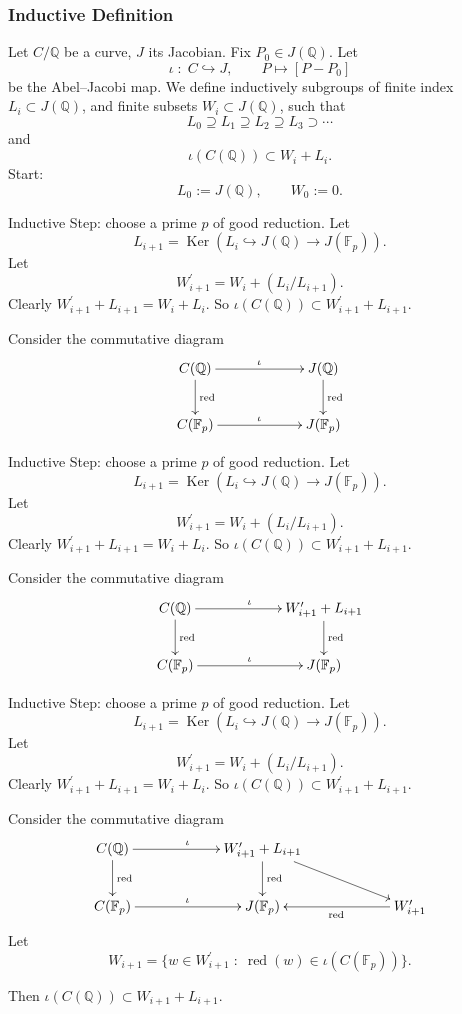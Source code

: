 \documentclass{beamer}
\DeclareMathOperator{\Ker}{Ker}
\DeclareMathOperator{\red}{red}
\newcommand{\Q}{{\mathbb Q}}
\newcommand{\F}{{\mathbb F}}
\theoremstyle{definition}
\theoremstyle{remark}
\begin{document}
\begin{frame}
\frametitle{Inductive Definition}
Let $C/\Q$ be a curve, $J$ its Jacobian. Fix $P_0 \in J(\Q)$.  Let
\[
\iota \; : \; C \hookrightarrow J, \qquad P \mapsto [P-P_0]
\] 
be the Abel--Jacobi map. 
We define inductively subgroups of finite index 
$L_i \subset J(\Q)$, and finite subsets
$W_i \subset J(\Q)$, such that
\[
L_0 \supseteq L_1 \supseteq L_2 \supseteq L_3 \supset \cdots
\]
and 
\[
\iota(C(\Q)) \subset W_i+L_i. 
\]
Start:
\[
L_0:=J(\Q), \qquad W_0:={0}.
\]
\end{frame}
\begin{frame}
Inductive Step: choose a prime $p$ of good reduction. Let
\[
L_{i+1}=\Ker\left(L_i \hookrightarrow J(\Q) \rightarrow J(\F_p) \right).
\]
Let
\[
W_{i+1}^\prime=W_i+ \left(L_i/L_{i+1} \right).
\]
Clearly $W_{i+1}^\prime+L_{i+1}=W_i+L_i$. So $\iota(C(\Q)) \subset W_{i+1}^\prime+L_{i+1}$.

\bigskip

Consider the commutative diagram
\[
\xymatrixcolsep{5pc}
\xymatrix{
C(\Q) \ar^{\iota}[r] \ar^{\mathrm{red}}[d]  & J(\Q) 
\ar[d]^{\mathrm{red}} \\
C(\F_p) \ar^{\iota}[r] & J(\F_p)   \\
}
\]
\end{frame}
\begin{frame}
Inductive Step: choose a prime $p$ of good reduction. Let
\[
L_{i+1}=\Ker\left(L_i \hookrightarrow J(\Q) \rightarrow J(\F_p) \right).
\]
Let
\[
W_{i+1}^\prime=W_i+ \left(L_i/L_{i+1} \right).
\]
Clearly $W_{i+1}^\prime+L_{i+1}=W_i+L_i$. So $\iota(C(\Q)) \subset W_{i+1}^\prime+L_{i+1}$.

\bigskip

Consider the commutative diagram
\[
\xymatrixcolsep{5pc}
\xymatrix{
C(\Q) \ar^{\iota}[r] \ar^{\mathrm{red}}[d]  & W_{i+1}^\prime+L_{i+1} 
\ar[d]^{\mathrm{red}} \\
C(\F_p) \ar^{\iota}[r] & J(\F_p)   \\
}
\]
\end{frame}
\begin{frame}
Inductive Step: choose a prime $p$ of good reduction. Let
\[
L_{i+1}=\Ker\left(L_i \hookrightarrow J(\Q) \rightarrow J(\F_p) \right).
\]
Let
\[
W_{i+1}^\prime=W_i+ \left(L_i/L_{i+1} \right).
\]
Clearly $W_{i+1}^\prime+L_{i+1}=W_i+L_i$. So $\iota(C(\Q)) \subset W_{i+1}^\prime+L_{i+1}$.

\bigskip

Consider the commutative diagram
\[
\xymatrixcolsep{5pc}
\xymatrix{
C(\Q) \ar^{\iota}[r] \ar^{\mathrm{red}}[d]  & W_{i+1}^\prime+L_{i+1} 
\ar[d]^{\mathrm{red}} \ar[rd] & \\
C(\F_p) \ar^{\iota}[r] & J(\F_p) & W_{i+1}^\prime \ar^{\red}[l]   \\
}
\]
\pause
Let
\[
W_{i+1}=\{w \in W_{i+1}^\prime \; : \; \red(w) \in \iota ( C(\F_p))\}.
\]

Then $\iota(C(\Q)) \subset W_{i+1}+L_{i+1}$.
\end{frame}
\end{document}
